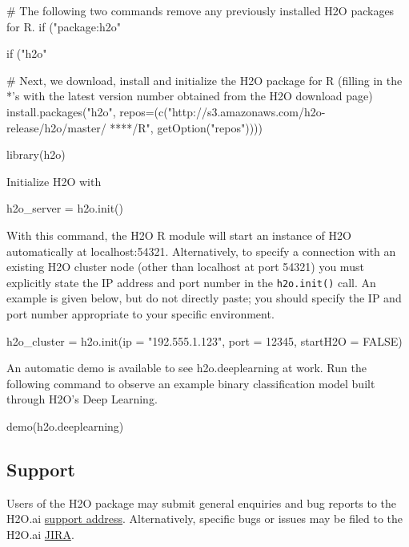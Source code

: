 \documentclass[11pt]{article}
\begin{document}
\begin{spverbatim}
# The following two commands remove any previously installed H2O packages for R.
if ("package:h2o" %

if ("h2o" %

# Next, we download, install and initialize the H2O package for R (filling in the *'s with the latest version number obtained from the H2O download page)
install.packages("h2o", repos=(c("http://s3.amazonaws.com/h2o-release/h2o/master/
****/R", getOption("repos"))))

library(h2o)

\end{spverbatim}
\noindent
Initialize H2O with

\begin{spverbatim}
h2o_server = h2o.init()

\end{spverbatim}
\noindent
With this command, the H2O R module will start an instance of H2O automatically at localhost:54321. Alternatively,  to specify a connection with an existing H2O cluster node (other than localhost at port 54321) you must explicitly state the IP address and port number in the \texttt{h2o.init()} call. An example is given below, but do not directly paste; you should specify the IP and port number appropriate to your specific environment.

\begin{spverbatim}
h2o_cluster = h2o.init(ip = "192.555.1.123", port = 12345, startH2O = FALSE)

\end{spverbatim}
\noindent
An automatic demo is available to see h2o.deeplearning at work. Run the following command to observe an example binary classification model built through H2O's Deep Learning.

\begin{spverbatim}
demo(h2o.deeplearning)
\end{spverbatim}

\subsection{Support} \label{1.2}

Users of the H2O package may submit general enquiries and bug reports to the H2O.ai \href{mailto:h2ostream@googlegroups.com}{support address}. Alternatively, specific bugs or issues may be filed to the H2O.ai \href{https://0xdata.atlassian.net/secure/Dashboard.jspa}{JIRA}.
\end{document}
